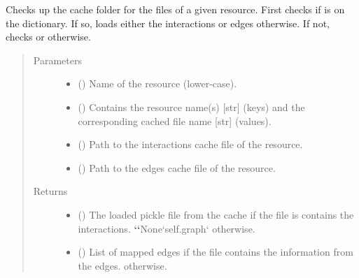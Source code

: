 \documentclass[letterpaper,10pt,english]{sphinxmanual}
\begin{document}
\begin{fulllineitems}
\begin{fulllineitems}
\label{\detokenize{main:pypath.main.PyPath.lookup_cache}}
Checks up the cache folder for the files of a given resource.
First checks if  is on the  dictionary.
If so, loads either the interactions or edges otherwise. If
not, checks  or  otherwise.
\begin{quote}\begin{description}
\item[{Parameters}] \leavevmode\begin{itemize}
\item {} 
 () \textendash{} Name of the resource (lower-case).

\item {} 
 () \textendash{} Contains the resource name(s) {[}str{]} (keys) and the
corresponding cached file name {[}str{]} (values).

\item {} 
 () \textendash{} Path to the interactions cache file of the resource.

\item {} 
 () \textendash{} Path to the edges cache file of the resource.

\end{itemize}

\item[{Returns}] \leavevmode
\begin{itemize}
\item {} 
() \textendash{} The loaded pickle file from the cache if the
file is contains the interactions. {\color{red}\bfseries{}{}`{}`}None{}`self.graph{}` otherwise.

\item {} 
() \textendash{} List of mapped edges if the file contains the
information from the edges. \sphinxcode{\sphinxupquote{{[}{]}}} otherwise.


\end{itemize}
\end{description}
\end{quote}
\end{fulllineitems}
\end{fulllineitems}
\end{document}
